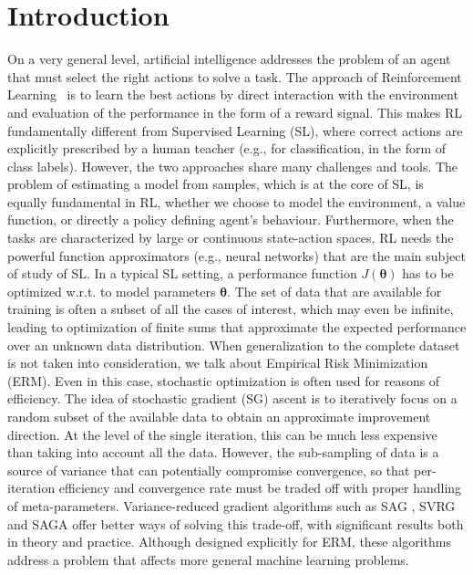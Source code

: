 \documentclass{article}
\makeatletter
\theoremstyle{remark}
\theoremstyle{definition}
\DeclareRobustCommand{\eg}{e.g.,\@\xspace}
\DeclareRobustCommand{\wrt}{w.r.t.\@\xspace}
\newcommand{\vtheta}{\boldsymbol{\theta}}
\makeatother
\begin{document}
\section{Introduction}
On a very general level, artificial intelligence addresses the problem of an agent that must select the right actions to solve a task. The approach of Reinforcement Learning~\citep{sutton1998reinforcement} is to learn the best actions by direct interaction with the environment and evaluation of the performance in the form of a reward signal. This makes RL fundamentally different from Supervised Learning (SL), where correct actions are explicitly prescribed by a human teacher (\eg for classification, in the form of class labels). However, the two approaches share many challenges and tools. The problem of estimating a model from samples, which is at the core of SL, is equally fundamental in RL, whether we choose to model the environment, a value function, or directly a policy defining agent's behaviour. Furthermore, when the tasks are characterized by large or continuous state-action spaces, RL needs the powerful function approximators (\eg neural networks) that are the main subject of study of SL.
In a typical SL setting, a performance function $J(\vtheta)$ has to be optimized \wrt to model parameters $\vtheta$. The set of data that are available for training is often a subset of all the cases of interest, which may even be infinite, leading to optimization of finite sums that approximate the expected performance over an unknown data distribution. When generalization to the complete dataset is not taken into consideration, we talk about Empirical Risk Minimization (ERM). Even in this case, stochastic optimization is often used for reasons of efficiency. The idea of stochastic gradient (SG) ascent \cite{nesterov2013introductory} is to iteratively focus on a random subset of the available data to obtain an approximate improvement direction. At the level of the single iteration, this can be much less expensive than taking into account all the data. However, the sub-sampling of data is a source of variance that can potentially compromise convergence, so that per-iteration efficiency and convergence rate must be traded off with proper handling of meta-parameters.
Variance-reduced gradient algorithms such as SAG \cite{roux2012stochastic}, SVRG \cite{johnson2013accelerating} and SAGA \cite{defazio2014saga} offer better ways of solving this trade-off, with significant results both in theory and practice. Although designed explicitly for ERM, these algorithms address a problem that affects more general machine learning problems. 
\end{document}
